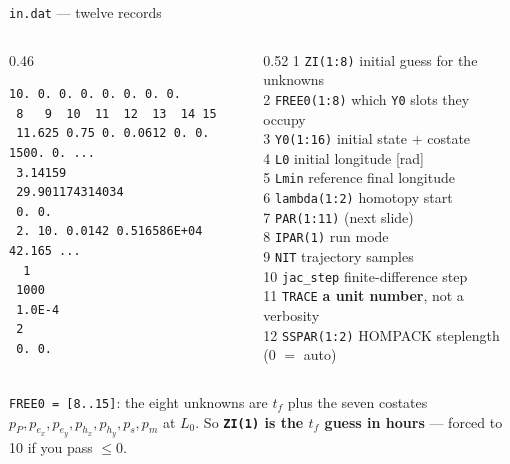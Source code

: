\documentclass[10pt,aspectratio=169]{beamer}
\newcommand{\code}[1]{\texttt{\small #1}}
\newcommand{\file}[1]{\texttt{\small #1}}
\begin{document}
\begin{frame}[fragile]{\file{in.dat} --- twelve records}

\begin{columns}[T]
\begin{column}{0.46\textwidth}
\begin{lstlisting}[style=plain]
 10. 0. 0. 0. 0. 0. 0. 0.
 8   9  10  11  12  13  14 15
 11.625 0.75 0. 0.0612 0. 0. 1500. 0. ...
 3.14159
 29.901174314034
 0. 0.
 2. 10. 0.0142 0.516586E+04 42.165 ...
  1
 1000
 1.0E-4
 2
 0. 0.
\end{lstlisting}
\end{column}
\begin{column}{0.52\textwidth}
\scriptsize
1 \code{ZI(1:8)} initial guess for the unknowns\\
2 \code{FREE0(1:8)} which \code{Y0} slots they occupy\\
3 \code{Y0(1:16)} initial state $+$ costate\\
4 \code{L0} initial longitude [rad]\\
5 \code{Lmin} reference final longitude\\
6 \code{lambda(1:2)} homotopy start\\
7 \code{PAR(1:11)} (next slide)\\
8 \code{IPAR(1)} run mode\\
9 \code{NIT} trajectory samples\\
10 \code{jac\_step} finite-difference step\\
11 \code{TRACE} \textbf{a unit number}, not a verbosity\\
12 \code{SSPAR(1:2)} HOMPACK steplength (0 $=$ auto)
\end{column}
\end{columns}

\vspace{3pt}
\code{FREE0 = [8..15]}: the eight unknowns are $t_f$ plus the seven costates
$p_P,p_{e_x},p_{e_y},p_{h_x},p_{h_y},p_s,p_m$ at $L_0$. So \textbf{\code{ZI(1)}
is the $t_f$ guess in hours} --- forced to 10 if you pass $\le 0$.
\end{frame}
\end{document}
